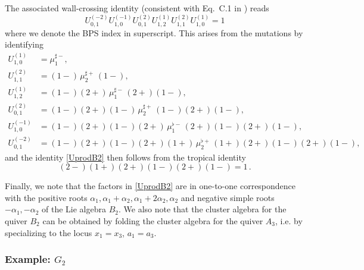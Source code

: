 \documentclass[12pt,reqno]{article}
\numberwithin{equation}{section}
\newcommand{\be}{\begin{equation}}
\newcommand{\ee}{\end{equation}}
\numberwithin{equation}{section}
\begin{document}
The associated wall-crossing identity (consistent with Eq.\, C.1 in \cite{Manschot:2010qz}) reads
\be
\label{UprodB2}
U_{0,1}^{(-2)} U_{1,0}^{(-1)}  U_{0,1}^{(2)} U_{1,2}^{(1)} U_{1,1}^{(2)} U_{1,0}^{(1)} = 1
\ee
where we denote the BPS index in superscript.
This arises from the mutations by identifying
\be
\begin{split}
U_{1,0}^{(1)} &= \mu_1^{\sharp -} , \\
U_{1,1}^{(2)} &= (1-) \, \mu_2^{\sharp +} \, (1-), \\
U_{1,2}^{(1)} &= (1-)(2+) \,  \mu_1^{\sharp -} \, (2+)(1-), \\
U_{0,1}^{(2)} &=  (1-)(2+)(1-) \, \mu_2^{\sharp +} \, (1-)(2+)(1-), \\
U_{1,0}^{(-1)} &=  (1-)(2+)(1-)(2+) \, \mu_1^{\flat -} \, (2+)(1-)(2+)(1-), \\
U_{0,1}^{(-2)} &=  (1-)(2+)(1-)(2+)(1+) \,  \mu_2^{\flat +} \, (1+)(2+)(1-)(2+)(1-),
\end{split}
\ee
and the identity \eqref{UprodB2} then follows from the tropical identity
\be
(2-)(1+)(2+)(1-)(2+)(1-)=1\, .
\ee


Finally, we note that the factors in \eqref{UprodB2} are in one-to-one correspondence with
the positive roots $\alpha_1,\alpha_1+\alpha_2,
\alpha_1+2\alpha_2,\alpha_2$ and negative simple roots $-\alpha_1,-\alpha_2$ of the Lie algebra $B_2$.
We also note that the cluster algebra for the quiver $B_2$ can be obtained by folding
the cluster algebra for the quiver $A_3$, i.e. by specializing to the locus $x_1=x_3$,
$a_1=a_3$.


\subsubsection{Example: $G_2$}
\label{subsec-g2}
\end{document}
